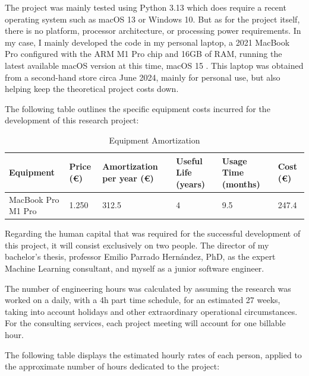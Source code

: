 \documentclass[12pt]{report} %
\begin{document}
The project was mainly tested using Python 3.13 \cite{python3.13} which does require a recent operating system such as macOS 13 or Windows 10. But as for the project itself, there is no platform, processor architecture, or processing power requirements. In my case, I mainly developed the code in my personal laptop, a 2021 MacBook Pro configured with the ARM M1 Pro chip and 16GB of RAM, running the latest available macOS version at this time, macOS 15 \cite{macos}. This laptop was obtained from a second-hand store circa June 2024, mainly for personal use, but also helping keep the theoretical project costs down.

The following table outlines the specific equipment costs incurred for the development of this research project:
\begin{table}[H]
	\caption{Equipment Amortization}
	\centering
	\begin{tabular}{|P{2.8cm}|P{1.8cm}|P{2.5cm}|P{1.5cm}|P{2cm}|P{1.5cm}|}
		\hline
		\textbf{Equipment} & \textbf{Price (€)} & \textbf{Amortization per year (€)} & \textbf{Useful Life (years)} & \textbf{Usage Time (months)} & \textbf{Cost (€)} \\
		\hline
		MacBook Pro M1 Pro & 1.250 & 312.5 & 4 & 9.5 & 247.4 \\
		\hline
	\end{tabular}
\end{table}

Regarding the human capital that was required for the successful development of this project, it will consist exclusively on two people. The director of my bachelor's thesis, professor Emilio Parrado Hernández, PhD, as the expert Machine Learning consultant, and myself as a junior software engineer. 

The number of engineering hours was calculated by assuming the research was worked on a daily, with a 4h part time schedule, for an estimated 27 weeks, taking into account holidays and other extraordinary operational circumstances. For the consulting services, each project meeting will account for one billable hour.

The following table displays the estimated hourly rates of each person, applied to the approximate number of hours dedicated to the project:
            
\end{document}

